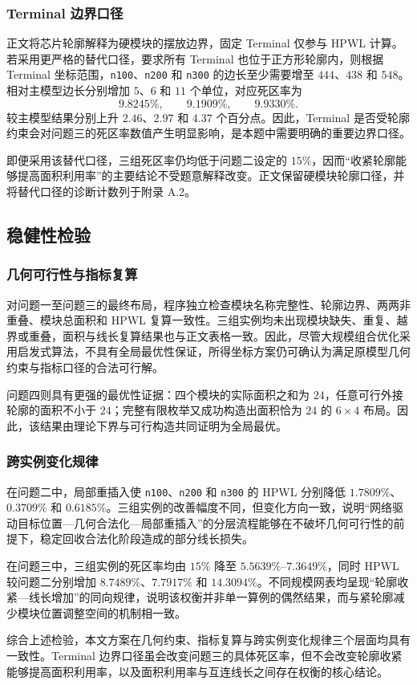 \subsubsection{Terminal 边界口径}

正文将芯片轮廓解释为硬模块的摆放边界，固定 Terminal 仅参与 HPWL 计算。若采用更严格的替代口径，要求所有 Terminal 也位于正方形轮廓内，则根据 Terminal 坐标范围，\texttt{n100}、\texttt{n200} 和 \texttt{n300} 的边长至少需要增至 $444$、$438$ 和 $548$。相对主模型边长分别增加 $5$、$6$ 和 $11$ 个单位，对应死区率为
\begin{equation}
  9.8245\%,\qquad 9.1909\%,\qquad 9.9330\%.
  \label{eq:terminal_sensitivity}
\end{equation}
较主模型结果分别上升 $2.46$、$2.97$ 和 $4.37$ 个百分点。因此，Terminal 是否受轮廓约束会对问题三的死区率数值产生明显影响，是本题中需要明确的重要边界口径。

即便采用该替代口径，三组死区率仍均低于问题二设定的 $15\%$，因而“收紧轮廓能够提高面积利用率”的主要结论不受题意解释改变。正文保留硬模块轮廓口径，并将替代口径的诊断计数列于附录 A.2。

\subsection{稳健性检验}

\subsubsection{几何可行性与指标复算}

对问题一至问题三的最终布局，程序独立检查模块名称完整性、轮廓边界、两两非重叠、模块总面积和 HPWL 复算一致性。三组实例均未出现模块缺失、重复、越界或重叠，面积与线长复算结果也与正文表格一致。因此，尽管大规模组合优化采用启发式算法，不具有全局最优性保证，所得坐标方案仍可确认为满足原模型几何约束与指标口径的合法可行解。

问题四则具有更强的最优性证据：四个模块的实际面积之和为 $24$，任意可行外接轮廓的面积不小于 $24$；完整有限枚举又成功构造出面积恰为 $24$ 的 $6\times4$ 布局。因此，该结果由理论下界与可行构造共同证明为全局最优。

\subsubsection{跨实例变化规律}

在问题二中，局部重插入使 \texttt{n100}、\texttt{n200} 和 \texttt{n300} 的 HPWL 分别降低 $1.7809\%$、$0.3709\%$ 和 $0.6185\%$。三组实例的改善幅度不同，但变化方向一致，说明“网络驱动目标位置---几何合法化---局部重插入”的分层流程能够在不破坏几何可行性的前提下，稳定回收合法化阶段造成的部分线长损失。

在问题三中，三组实例的死区率均由 $15\%$ 降至 $5.5639\%$--$7.3649\%$，同时 HPWL 较问题二分别增加 $8.7489\%$、$7.7917\%$ 和 $14.3094\%$。不同规模网表均呈现“轮廓收紧---线长增加”的同向规律，说明该权衡并非单一算例的偶然结果，而与紧轮廓减少模块位置调整空间的机制相一致。

综合上述检验，本文方案在几何约束、指标复算与跨实例变化规律三个层面均具有一致性。Terminal 边界口径虽会改变问题三的具体死区率，但不会改变轮廓收紧能够提高面积利用率，以及面积利用率与互连线长之间存在权衡的核心结论。
